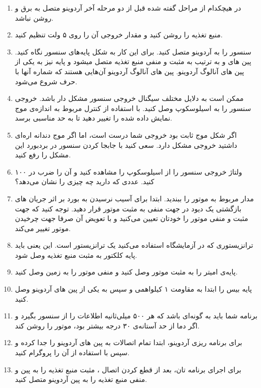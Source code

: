 \begin{enumerate}
    \item در هیچکدام از مراحل گفته شده قبل از دو مرحله آخر آردوینو متصل به برق و روشن نباشد.
    \item منبع تغذیه را روشن کنید و مقدار خروجی آن را روی ۵ ولت تنظیم کنید.
    \item سنسور را به آردوینو متصل کنید. برای این کار به شکل پایه‌های سنسور نگاه کنید.
    پین های  و  به ترتیب به مثبت و منفی منبع تغذیه متصل میشود و پایه  نیز به یکی از پین های آنالوگ آردوینو. پین های آنالوگ آردوینو آن‌هایی هستند که شماره آنها با حرف  شروع می‌شود.
    \item ممکن است به دلایل مختلف سیگنال خروجی سنسور مشکل دار باشد. خروجی سنسور را به اسیلوسکوپ وصل کنید. با استفاده از کنترل مربوط به  اندازه‌ی موج نمایش داده شده را تغییر دهید تا به حد مناسبی برسد.
    \item اگر شکل موج ثابت بود خروجی شما درست است، اما اگر موج دندانه اره‌ای داشتید خروجی مشکل دارد. سعی کنید با جابجا کردن سنسور در بردبورد این مشکل را رفع کنید.
    \item ولتاژ خروجی سنسور را از اسیلوسکوپ را مشاهده کنید و آن را ضرب در ۱۰۰ کنید. عددی که دارید چه چیزی را نشان می‌دهد؟
    \item مدار مربوط به موتور را ببندید. ابتدا برای آسیب نرسیدن به بورد بر اثر جریان های بازگشتی یک دیود در جهت منفی به مثبت موتور قرار دهید. توجه کنید که جهت مثبت و منفی موتور را خودتان تعیین می‌کنید و با تعویض آن صرفا جهت چرخیدن موتور تغییر می‌کند.
    \item ترانزیستوری که در آزمایشگاه استفاده می‌کنید یک ترانزیستور  است. این یعنی باید پایه کلکتور به مثبت منبع تغذیه وصل شود.
    \item پایه‌ی امیتر را به مثبت موتور وصل کنید و منفی موتور را به زمین وصل کنید.
    \item پایه بیس را ابتدا به مقاومت ۱ کیلواهمی و سپس به یکی از پین های آردوینو وصل کنید.
    \item برنامه شما باید به گونه‌ای باشد که هر ۵۰۰ میلی‌ثانیه اطلاعات را از سنسور بگیرد و اگر دما از حد آستانه‌ی ۳۰ درجه بیشتر بود، موتور را روشن کند.
    \item برای برنامه ریزی آردوینو، ابتدا تمام اتصالات به پین های آردوینو را جدا کرده و سپس با استفاده از  آن را پروگرام کنید.
    \item برای اجرای برنامه تان، بعد از قطع کردن اتصال ، مثبت منبع تغذیه را به پین  و منفی منبع تغذیه را به پین  آردوینو متصل کنید.
\end{enumerate}

